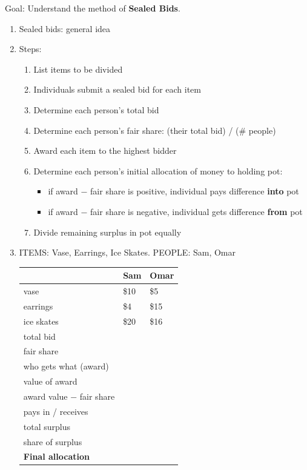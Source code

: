 \documentclass[12pt]{article}
\renewcommand{\emph}[1]{\textsf{\textbf{#1}}}
\begin{document}
Goal: Understand the method of \emph{Sealed Bids}.
\begin{enumerate}
\item Sealed bids: general idea
\vspace{1in}
\item Steps:
\begin{enumerate}
\item List items to be divided
\item Individuals submit a sealed bid for each item
\item Determine each person's total bid
\item Determine each person's fair share:  \: (their total bid) / (\# people)
\item Award each item to the highest bidder
\item Determine each person's initial allocation of money to holding pot:
\begin{itemize}
\item if award $-$ fair share is positive, individual pays difference \emph{into} pot
\item if award $-$ fair share is negative, individual gets difference \emph{from} pot
\end{itemize}
\item Divide remaining surplus in pot equally
\end{enumerate}



\item {} ITEMS: Vase, Earrings, Ice Skates. PEOPLE: Sam, Omar

\begin{tabularx}{\linewidth}{| p{2in} | X | X |}
\hline
& {\bf Sam} & {\bf Omar} \\ \hline \hline
vase & \$10 & \$5 \\ \hline
earrings & \$4 & \$15 \\ \hline
ice skates & \$20 & \$16 \\ \hline
total bid & & \\[10pt] \hline
fair share & & \\[10pt] \hline
 who gets what (award) & & \\[12pt] \hline
 value of award  & & \\[10pt] \hline
award value $-$ fair share  & & \\[10pt] \hline
pays in / receives  & & \\[10pt] \hline
total surplus   &  \multicolumn{2}{X|}{}  \\[10pt] \hline
share of surplus  & & \\[10pt] \hline
 \emph{Final allocation} & & \\[20pt]
\hline
\end{tabularx}


\end{enumerate}
\end{document}

